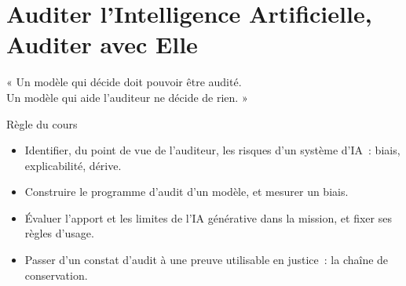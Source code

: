 
\chapter{Auditer l'Intelligence Artificielle, Auditer avec Elle}
\label{chap:audit-ia}

\epigraph{%
    « Un modèle qui décide doit pouvoir être audité.\\
    Un modèle qui aide l'auditeur ne décide de rien. »%
}{Règle du cours}


\begin{boxobjectifs}
\begin{itemize}
    \item Identifier, du point de vue de l'auditeur, les risques d'un
          système d'IA~: biais, explicabilité, dérive.
    \item Construire le programme d'audit d'un modèle, et mesurer un biais.
    \item Évaluer l'apport et les limites de l'IA générative dans la
          mission, et fixer ses règles d'usage.
    \item Passer d'un constat d'audit à une preuve utilisable en justice~:
          la chaîne de conservation.
\end{itemize}
\end{boxobjectifs}

